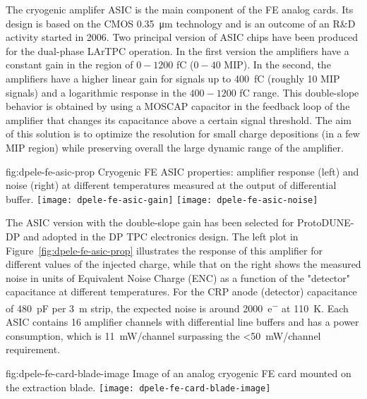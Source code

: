 The cryogenic amplifer ASIC is the main component of the FE analog cards. Its design is based on the CMOS \SI{0.35}{\micro\meter} technology and is an outcome of an R\&D  activity started in 2006. Two principal version of ASIC chips have been produced for the dual-phase LArTPC operation. In the first version the amplifiers have a constant gain in the region of $0-1200$ \si{\femto\coulomb} ($0-40$ MIP). In the second, the amplifiers have a higher linear gain for signals up to \SI{400}{\femto\coulomb} (roughly 10 MIP signals) and a logarithmic response in the  $400-1200$ \si{\femto\coulomb} range. This double-slope behavior is obtained by using a MOSCAP capacitor in the feedback loop of the amplifier that changes its capacitance above a certain signal threshold. The aim of this solution is to optimize the resolution for small charge depositions (in a few MIP region) while preserving overall the large dynamic range of the amplifier.

\begin{dunefigure}{fig:dpele-fe-asic-prop}
{Cryogenic FE ASIC properties: amplifier response (left) and noise (right) at different temperatures measured at the output of differential buffer.}
\texttt{[image: dpele-fe-asic-gain]}
\texttt{[image: dpele-fe-asic-noise]}
\end{dunefigure}

The ASIC version with the double-slope gain has been selected for ProtoDUNE-DP and adopted in the DP TPC electronics design. The left plot in Figure~\ref{fig:dpele-fe-asic-prop} illustrates the response of this amplifier for different values of the injected charge, while that on the right shows the measured noise in units of Equivalent Noise Charge (ENC) as a function of the "detector" capacitance at different temperatures. For the CRP anode (detector) capacitance of \SI{480}{\pico\farad} per \SI{3}{\metre} strip, the expected noise is around \SI{2000}{e^{-}} at \SI{110}{\kelvin}. Each ASIC contains \num{16} amplifier channels with differential line buffers and has a power consumption, which is \SI{11}{\milli\watt/channel} surpassing the \SI{<50}{\milli\watt/channel} requirement. 

\begin{dunefigure}{fig:dpele-fe-card-blade-image}
{Image of an analog cryogenic FE card mounted on the extraction blade.}
\texttt{[image: dpele-fe-card-blade-image]}
\end{dunefigure}

